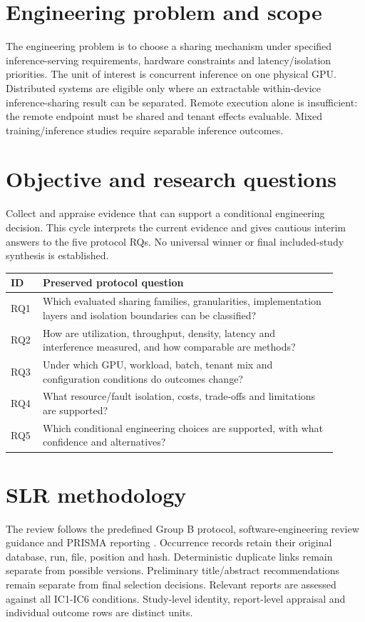 \documentclass[12pt,a4paper]{article}
\begin{document}
\section{Engineering problem and scope}
The engineering problem is to choose a sharing mechanism under specified inference-serving requirements, hardware constraints and latency/\allowbreak{}isolation priorities. The unit of interest is concurrent inference on one physical GPU. Distributed systems are eligible only where an extractable within-device inference-sharing result can be separated. Remote execution alone is insufficient: the remote endpoint must be shared and tenant effects evaluable. Mixed training/\allowbreak{}inference studies require separable inference outcomes.


\section{Objective and research questions}
Collect and appraise evidence that can support a conditional engineering decision. This cycle interprets the current evidence and gives cautious interim answers to the five protocol RQs. No universal winner or final included-study synthesis is established.


\begin{longtable}{p{0.08\linewidth}p{0.83\linewidth}}
\toprule
ID & Preserved protocol question\\\midrule
\endhead
RQ1 & Which evaluated sharing families, granularities, implementation layers and isolation boundaries can be classified?\\
RQ2 & How are utilization, throughput, density, latency and interference measured, and how comparable are methods?\\
RQ3 & Under which GPU, workload, batch, tenant mix and configuration conditions do outcomes change?\\
RQ4 & What resource/\allowbreak{}fault isolation, costs, trade-offs and limitations are supported?\\
RQ5 & Which conditional engineering choices are supported, with what confidence and alternatives?\\
\bottomrule
\end{longtable}

\section{SLR methodology}
The review follows the predefined Group B protocol, software-engineering review guidance and PRISMA reporting \cite{kitchenham,petersen,prisma,prismas}.
Occurrence records retain their original database, run, file, position and hash. Deterministic duplicate links remain separate from possible versions. Preliminary title/\allowbreak{}abstract recommendations remain separate from final selection decisions. Relevant reports are assessed against all IC1-IC6 conditions. Study-level identity, report-level appraisal and individual outcome rows are distinct units.
\end{document}
